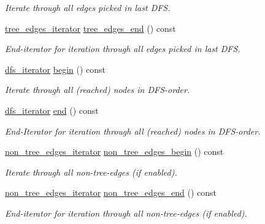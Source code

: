 \begin{DoxyCompactItemize}
\begin{DoxyCompactList}\small\item\em Iterate through all edges picked in last D\+FS. \end{DoxyCompactList}\item 
\mbox{\hyperlink{classdfs_accde8d5403404f6d22fe4756d4ffedd5}{tree\+\_\+edges\+\_\+iterator}} \mbox{\hyperlink{classdfs_ad1b9f759569cb52ba7ee415862c79831}{tree\+\_\+edges\+\_\+end}} () const
\begin{DoxyCompactList}\small\item\em End-\/iterator for iteration through all edges picked in last D\+FS. \end{DoxyCompactList}\item 
\mbox{\hyperlink{classdfs_a15fe023a5a1f7ddda00f3d87110d9a32}{dfs\+\_\+iterator}} \mbox{\hyperlink{classdfs_ab06650dd8cbd5e76b0c73b71458ec5ec}{begin}} () const
\begin{DoxyCompactList}\small\item\em Iterate through all (reached) nodes in D\+F\+S-\/order. \end{DoxyCompactList}\item 
\mbox{\hyperlink{classdfs_a15fe023a5a1f7ddda00f3d87110d9a32}{dfs\+\_\+iterator}} \mbox{\hyperlink{classdfs_af847633fa642258d3522e8deb26aef37}{end}} () const
\begin{DoxyCompactList}\small\item\em End-\/\+Iterator for iteration through all (reached) nodes in D\+F\+S-\/order. \end{DoxyCompactList}\item 
\mbox{\hyperlink{classdfs_a95e353f354d3b31daded0c4fe749171a}{non\+\_\+tree\+\_\+edges\+\_\+iterator}} \mbox{\hyperlink{classdfs_a4efe5bb72d00305e6b226e67c2b2ef6e}{non\+\_\+tree\+\_\+edges\+\_\+begin}} () const
\begin{DoxyCompactList}\small\item\em Iterate through all non-\/tree-\/edges (if enabled). \end{DoxyCompactList}\item 
\mbox{\hyperlink{classdfs_a95e353f354d3b31daded0c4fe749171a}{non\+\_\+tree\+\_\+edges\+\_\+iterator}} \mbox{\hyperlink{classdfs_ad9cd92a18bda23edca8ab3ac60a15ef4}{non\+\_\+tree\+\_\+edges\+\_\+end}} () const
\begin{DoxyCompactList}\small\item\em End-\/iterator for iteration through all non-\/tree-\/edges (if enabled). \end{DoxyCompactList}\item 

\end{DoxyCompactItemize}
